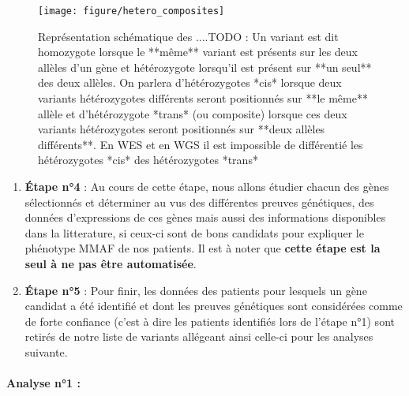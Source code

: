 \documentclass[12pt,twoside]{reedthesis}
\theoremstyle{definition}
\theoremstyle{definition}
\theoremstyle{remark}
\begin{document}
  \begin{figure}
  
  {\centering \texttt{[image: figure/hetero\_composites]} 
  
  }
  
  \caption[Représentation schématique des ....TODO]{Représentation schématique des ....TODO : Un variant est dit homozygote lorsque le **même** variant est présents sur les deux allèles d'un gène et hétérozygote lorsqu'il est présent sur **un seul** des deux allèles. On parlera d'hétérozygotes *cis* lorsque deux variants hétérozygotes différents seront positionnés sur **le même** allèle et d'hétérozygote *trans* (ou composite) lorsque ces deux variants hétérozygotes seront positionnés sur **deux allèles différents**. En WES et en WGS il est impossible de différentié les hétérozygotes *cis* des hétérozygotes *trans*}\label{fig:compositehet}
  \end{figure}
  
  \begin{enumerate}
  \def\labelenumi{\arabic{enumi}.}
  \setcounter{enumi}{3}
  \item
    \textbf{Étape n°4} : Au cours de cette étape, nous allons étudier
    chacun des gènes sélectionnés et déterminer au vus des différentes
    preuves génétiques, des données d'expressions de ces gènes mais aussi
    des informations disponibles dans la litterature, si ceux-ci sont de
    bons candidats pour expliquer le phénotype MMAF de nos patients. Il
    est à noter que \textbf{cette étape est la seul à ne pas être
    automatisée}.
  \item
    \textbf{Étape n°5} : Pour finir, les données des patients pour
    lesquels un gène candidat a été identifié et dont les preuves
    génétiques sont considérées comme de forte confiance (c'est à dire les
    patients identifiés lors de l'étape n°1) sont retirés de notre liste
    de variants allégeant ainsi celle-ci pour les analyses suivante.
  \end{enumerate}
  
  \newpage  
  
  \paragraph{Analyse n°1 :}\label{analyse-n1}
  
\end{document}
